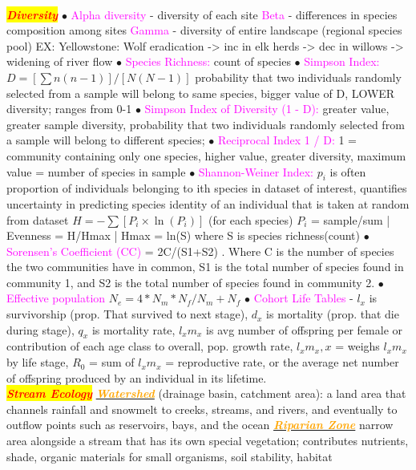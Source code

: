 \documentclass{article}
\newcommand{\ddd}{$\bullet$}
\newcommand{\red}[1]{\textcolor{red}{#1}}
\newcommand{\pink}[1]{\textcolor{magenta}{#1}}
\newcommand{\orange}[1]{\textcolor{orange}{#1}}
\newcommand{\mysection}[1]{\colorbox{yellow}{\textbf{\textit{\red{#1}}}}}
\newcommand{\mysubsection}[1]{\underline{\textbf{{\textit{\orange{#1}}}}}}
\newcommand{\vocab}[1]{{\pink{#1}}}
\begin{document}
\begin{multicols*}{4}
    \\
    \mysection{Diversity}
		\ddd \vocab{ Alpha diversity } - diversity of each site \vocab{ Beta } - differences in species composition among sites \vocab{ Gamma } - diversity of entire landscape (regional species pool) EX: Yellowstone: Wolf eradication -> inc in elk herds -> dec in willows -> widening of river flow \ddd \vocab{ Species Richness: } count of species
		\ddd \vocab{ Simpson Index: } $ D = [\sum n(n-1)]/ [N(N-1)] $ probability that two individuals randomly selected from a sample will belong to same species, bigger value of D, LOWER diversity; ranges from 0-1 
		\ddd \vocab{ Simpson Index of Diversity (1 - D): } greater value, greater sample diversity, probability that two individuals randomly selected from a sample will belong to different species; 
		\ddd \vocab{ Reciprocal Index 1 / D: } 1 = community containing only one species, higher value, greater diversity, maximum value = number of species in sample 
		\ddd \vocab{ Shannon-Weiner Index: } $ p_i $ is often proportion of individuals belonging to ith species in dataset of interest, quantifies uncertainty in predicting species identity of an individual that is taken at random from dataset $ H = - \sum [P_i \times \ln(P_i)] $ (for each species) $ P_i $ = sample/sum | Evenness = H/Hmax | Hmax = ln(S) where S is species richness(count) 
		\ddd \vocab{ Sorensen’s Coefficient (CC) } =  2C/(S1+S2) . Where C is the number of species the two communities have in common, S1 is the total number of species found in community 1, and S2 is the total number of species found in community 2. 
		\ddd \vocab{ Effective population } $ N_e = 4*N_m*N_f / N_m + N_f $ 
		\ddd \vocab{ Cohort Life Tables } - $ l_x $ is survivorship (prop. That survived to next stage), $ d_x $ is mortality (prop. that die during stage), $ q_x $ is mortality rate, $ l_xm_x $ is avg number of offspring per female or contribution of each age class to overall, pop. growth rate, $ l_xm_x,x $ = weighs $ l_xm_x $ by life stage, $ R_0 $ = sum of $ l_xm_x $ = reproductive rate, or the average net number of offspring produced by an individual in its lifetime.
    \\
    \mysection{Stream Ecology}
        \mysubsection{Watershed} (drainage basin, catchment area): a land area that channels rainfall and snowmelt to creeks, streams, and rivers, and eventually to outflow points such as reservoirs, bays, and the ocean
        \mysubsection{Riparian Zone} narrow area alongside a stream that has its own special vegetation; contributes nutrients, shade, organic materials for small organisms, soil stability, habitat

\end{multicols*}
\end{document}
